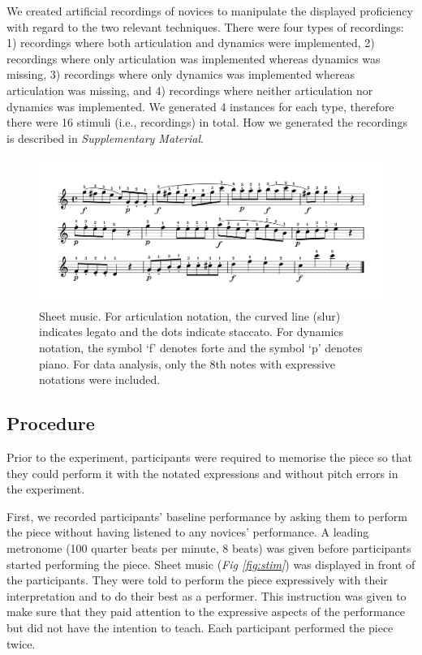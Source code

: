\documentclass[
  man,floatsintext]{apa6}
\begin{document}
We created artificial recordings of novices to manipulate the displayed proficiency with regard to the two relevant techniques. There were four types of recordings: 1) recordings where both articulation and dynamics were implemented, 2) recordings where only articulation was implemented whereas dynamics was missing, 3) recordings where only dynamics was implemented whereas articulation was missing, and 4) recordings where neither articulation nor dynamics was implemented. We generated 4 instances for each type, therefore there were 16 stimuli (i.e., recordings) in total. How we generated the recordings is described in \emph{Supplementary Material}.

\begin{figure}
\includegraphics[width=1\linewidth]{manuscript_files/figure-latex/stimli-1} \caption{\label{fig:stim}Sheet music. For articulation notation, the curved line (slur) indicates legato and the dots indicate staccato. For dynamics notation, the symbol `f' denotes forte and the symbol `p' denotes piano. For data analysis, only the 8th notes with expressive notations were included.}\label{fig:stimli}
\end{figure}

\hypertarget{procedure}{%
\subsection{Procedure}\label{procedure}}

Prior to the experiment, participants were required to memorise the piece so that they could perform it with the notated expressions and without pitch errors in the experiment.

First, we recorded participants' baseline performance by asking them to perform the piece without having listened to any novices' performance. A leading metronome (100 quarter beats per minute, 8 beats) was given before participants started performing the piece. Sheet music (\emph{Fig \ref{fig:stim}}) was displayed in front of the participants. They were told to perform the piece expressively with their interpretation and to do their best as a performer. This instruction was given to make sure that they paid attention to the expressive aspects of the performance but did not have the intention to teach. Each participant performed the piece twice.
\end{document}
